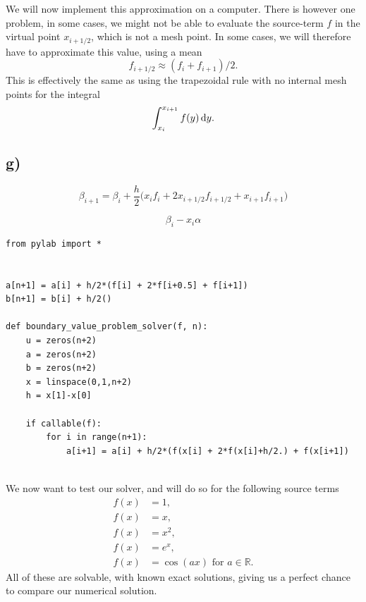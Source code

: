 \documentclass[a4paper, 11pt, notitlepage, english]{article}
\renewcommand{\d}{{\rm d}}
\begin{document}
We will now implement this approximation on a computer. There is however one problem, in some cases, we might not be able to evaluate the source-term $f$ in the virtual point $x_{i+1/2}$, which is not a mesh point. In some cases, we will therefore have to approximate this value, using a mean
$$f_{i+1/2} \approx (f_i + f_{i+1})/2.$$
This is effectively the same as using the trapezoidal rule with no internal mesh points for the integral 
$$\int_{x_i}^{x_{i+1}} f(y)\, \d y.$$


\subsection*{g)}
$$\beta_{i+1} = \beta_i + \frac{h}{2}\big(x_if_i + 2x_{i+1/2}f_{i+1/2} + x_{i+1}f_{i+1}\big)$$

$$\beta_i - x_i\alpha$$


\begin{lstlisting}
from pylab import *


a[n+1] = a[i] + h/2*(f[i] + 2*f[i+0.5] + f[i+1])
b[n+1] = b[i] + h/2()

def boundary_value_problem_solver(f, n):
    u = zeros(n+2)
    a = zeros(n+2)
    b = zeros(n+2)
    x = linspace(0,1,n+2)
    h = x[1]-x[0]

    if callable(f):
        for i in range(n+1):
            a[i+1] = a[i] + h/2*(f(x[i] + 2*f(x[i]+h/2.) + f(x[i+1])
  
\end{lstlisting}

We now want to test our solver, and will do so for the following source terms
\begin{align*}
f(x) &= 1, \\
f(x) &= x,\\
f(x) &= x^2, \\
f(x) &= e^x, \\
f(x) &= \cos(ax) \mbox{ for }a\in\mathbb{R}.
\end{align*}
All of these are solvable, with known exact solutions, giving us a perfect chance to compare our numerical solution.
\end{document}
